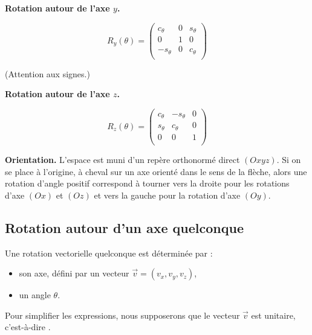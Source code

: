 \documentclass[11pt,class=report,crop=false]{standalone}
\begin{document}
\medskip

\textbf{Rotation autour de l'axe $y$.}

$$R_y(\theta) = 
\begin{pmatrix}
c_\theta & 0 & s_\theta \\
0 & 1 & 0 \\
-s_\theta & 0 &  c_\theta \\
\end{pmatrix}
$$

(Attention aux signes.)




\medskip

\textbf{Rotation autour de l'axe $z$.}

$$R_z(\theta) = 
\begin{pmatrix}
c_\theta & - s_\theta & 0 \\
s_\theta & c_\theta & 0 \\
0 & 0 & 1 \\
\end{pmatrix}
$$




\textbf{Orientation.}
L'espace est muni d'un repère orthonormé direct $(Oxyz)$.
Si on se place à l'origine, à cheval sur un axe orienté dans le sens de la flèche, 
alors une rotation d'angle positif correspond à tourner vers la droite pour les rotations d'axe $(Ox)$ et $(Oz)$ et vers la gauche pour la rotation d'axe $(Oy)$.



\subsection{Rotation autour d'un axe quelconque}

Une rotation vectorielle quelconque est déterminée par :
\begin{itemize}
  \item son axe, défini par un vecteur $\vec v = (v_x, v_y, v_z)$,
  \item un angle $\theta$.
\end{itemize}
Pour simplifier les expressions, nous supposerons que le vecteur $\vec v$ est unitaire, c'est-à-dire .
\end{document}
